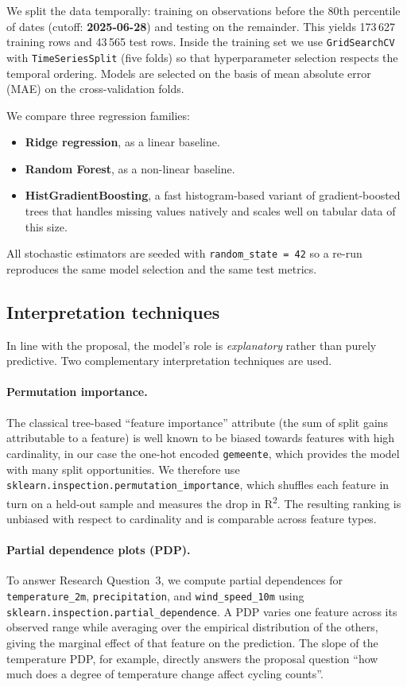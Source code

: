 \documentclass[11pt,a4paper]{article}
\begin{document}
We split the data temporally: training on observations before the 80th
percentile of dates (cutoff: \textbf{2025-06-28}) and testing on the
remainder. This yields 173\,627 training rows and 43\,565 test rows.
Inside the training set we use \texttt{GridSearchCV} with
\texttt{TimeSeriesSplit} (five folds) so that hyperparameter selection
respects the temporal ordering. Models are selected on the basis of
mean absolute error (MAE) on the cross-validation folds.

We compare three regression families:

\begin{itemize}[leftmargin=*]
  \item \textbf{Ridge regression}, as a linear baseline.
  \item \textbf{Random Forest}, as a non-linear baseline.
  \item \textbf{HistGradientBoosting}, a fast histogram-based variant
  of gradient-boosted trees that handles missing values natively and
  scales well on tabular data of this size.
\end{itemize}

All stochastic estimators are seeded with \texttt{random\_state = 42}
so a re-run reproduces the same model selection and the same test
metrics.

\subsection{Interpretation techniques}

In line with the proposal, the model's role is \emph{explanatory}
rather than purely predictive. Two complementary interpretation
techniques are used.

\paragraph{Permutation importance.}
The classical tree-based \enquote{feature importance} attribute (the
sum of split gains attributable to a feature) is well known to be
biased towards features with high cardinality, in our case the
one-hot encoded \texttt{gemeente}, which provides the model with many
split opportunities. We therefore use
\texttt{sklearn.inspection.permutation\_importance}, which shuffles
each feature in turn on a held-out sample and measures the drop in
R\textsuperscript{2}. The resulting ranking is unbiased with respect
to cardinality and is comparable across feature types.

\paragraph{Partial dependence plots (PDP).}
To answer Research Question~3, we compute partial dependences for
\texttt{temperature\_2m}, \texttt{precipitation}, and
\texttt{wind\_speed\_10m} using
\texttt{sklearn.inspection.partial\_dependence}. A PDP varies one
feature across its observed range while averaging over the empirical
distribution of the others, giving the marginal effect of that feature
on the prediction. The slope of the temperature PDP, for example,
directly answers the proposal question \enquote{how much does a degree
of temperature change affect cycling counts}.
\end{document}
